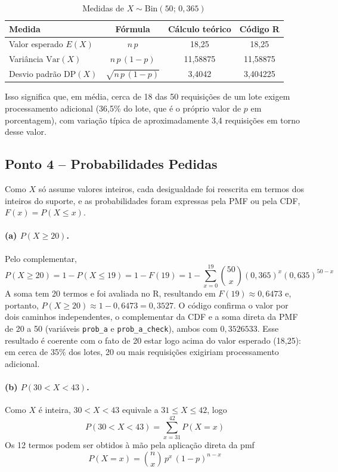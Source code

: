 \documentclass[10pt,a4paper]{article}
\begin{document}
\begin{table}[H]
\centering
\caption{Medidas de $X \sim \text{Bin}(50;\, 0{,}365)$}
\label{tab:q1-medidas}
\begin{tabular}{lccc}
\hline
\textbf{Medida} & \textbf{Fórmula} & \textbf{Cálculo teórico} & \textbf{Código R} \\
\hline
Valor esperado $E(X)$   & $n\,p$        & 18,25    & 18,25    \\
Variância $\text{Var}(X)$ & $n\,p\,(1-p)$ & 11,58875 & 11,58875 \\
Desvio padrão $\text{DP}(X)$ & $\sqrt{n\,p\,(1-p)}$ & 3,4042 & 3,404225 \\
\hline
\end{tabular}
\end{table}

Isso significa que, em média, cerca de 18 das 50 requisições de um lote exigem processamento adicional (36,5\% do lote, que é o próprio valor de $p$ em porcentagem), com variação típica de aproximadamente 3,4 requisições em torno desse valor.

\subsection{Ponto 4 -- Probabilidades Pedidas}

Como $X$ só assume valores inteiros, cada desigualdade foi reescrita em termos dos inteiros do suporte, e as probabilidades foram expressas pela PMF ou pela CDF, $F(x) = P(X \le x)$.

\paragraph{(a) $P(X \ge 20)$.} Pelo complementar,
\[
P(X \ge 20) = 1 - P(X \le 19) = 1 - F(19) = 1 - \sum_{x=0}^{19} \binom{50}{x}(0{,}365)^{x}(0{,}635)^{50-x}
\]
A soma tem 20 termos e foi avaliada no R, resultando em $F(19) \approx 0{,}6473$ e, portanto, $P(X \ge 20) \approx 1 - 0{,}6473 = 0{,}3527$. O código confirma o valor por dois caminhos independentes, o complementar da CDF e a soma direta da PMF de 20 a 50 (variáveis \texttt{prob\_a} e \texttt{prob\_a\_check}), ambos com $0{,}3526533$. Esse resultado é coerente com o fato de 20 estar logo acima do valor esperado (18,25): em cerca de 35\% dos lotes, 20 ou mais requisições exigiriam processamento adicional.

\paragraph{(b) $P(30 < X < 43)$.} Como $X$ é inteira, $30 < X < 43$ equivale a $31 \le X \le 42$, logo
\[
P(30 < X < 43) = \sum_{x=31}^{42} P(X = x)
\]
Os 12 termos podem ser obtidos à mão pela aplicação direta da pmf
\[
P(X = x) = \binom{n}{x}\, p^{x}\, (1-p)^{n-x}
\]
\end{document}
